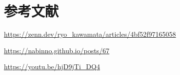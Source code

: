 \chapter{参考文献}

\url{https://zenn.dev/ryo_kawamata/articles/4bf52f97165058}

\url{https://nabinno.github.io/posts/67}

\url{https://youtu.be/hjD9jTi_DQ4}

